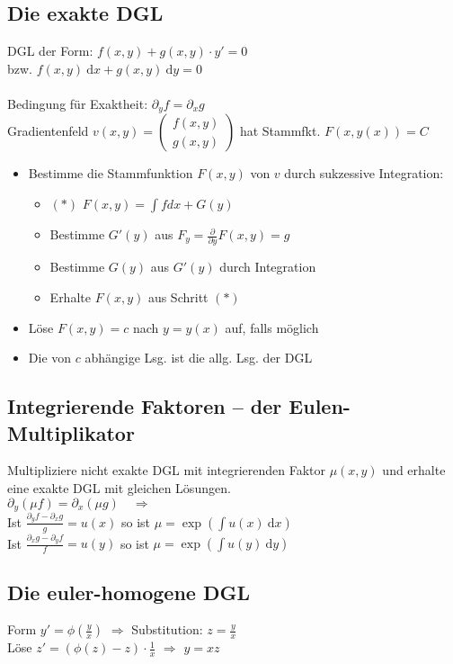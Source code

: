 \documentclass[6pt,a4paper]{scrartcl}
\newcommand{\vect}[1]{\ensuremath{\begin{pmatrix} #1 \end{pmatrix}}}			%
\newcommand{\Ra}[0]{\ensuremath{\Rightarrow}}									%
\newcommand{\diff}{\ensuremath{\ \mathrm d}}									%
\begin{document}
\begin{multicols}{4}
	\subsection{Die exakte DGL}
	DGL der Form: $\boxed{f(x,y) + g(x,y) \cdot y' = 0}$ \\   
	bzw. $f(x,y) \diff x + g(x,y) \diff y = 0$\\ \\
	Bedingung für Exaktheit: $\partial_y f = \partial_x g$\\
	Gradientenfeld $v(x,y) = \vect{f(x,y) \\ g(x,y)}$ hat Stammfkt. $F(x,y(x)) = C$
	\begin{itemize}\itemsep-4pt 
	\item Bestimme die Stammfunktion $F(x,y)$ von $v$ durch sukzessive Integration:
	\begin{itemize}
		\item $(*)$ $F(x,y) = \int f dx + G(y)$
		\item Bestimme $G'(y)$ aus $F_y = \frac{\partial}{\partial y} F(x,y) = g$
		\item Bestimme $G(y)$ aus $G'(y)$ durch Integration
		\item Erhalte $F(x,y)$ aus Schritt $(*)$
	\end{itemize}
	\item Löse $F(x,y) = c$ nach $y = y(x)$ auf, falls möglich
	\item Die von $c$ abhängige Lsg. ist die allg. Lsg. der DGL
\end{itemize}
	\subsection{Integrierende Faktoren -- der Eulen-Multiplikator}
	Multipliziere nicht exakte DGL mit integrierenden Faktor $\mu(x,y)$ und erhalte eine exakte DGL mit gleichen Lösungen.\\
	$\partial_y (\mu f) = \partial_x (\mu g) \quad \Ra \quad$ \\
	Ist $\frac{\partial_y f - \partial_x g}{g} = u(x)$ so ist $\mu = \exp(\int u(x) \diff x)$\\
	Ist $\frac{\partial_x g - \partial_y f}{f} = u(y)$ so ist $\mu = \exp(\int u(y) \diff y)$\\

	\subsection{Die euler-homogene DGL}
	Form $y' = \phi \left( \frac{y}{x} \right)$ \qquad $\Ra$ Substitution: $z = \frac{y}{x}$\\
	 \quad Löse $z' = (\phi(z) - z) \cdot \frac{1}{x}$ \quad $\Ra$ \quad $y = xz$



\end{multicols}
\end{document}
